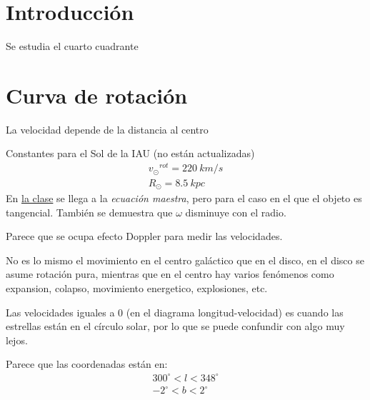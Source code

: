 \documentclass[letterpaper,oneside]{article}
\begin{document}
	
\templatePortrait

\templatePagecfg


\templateIndex

\templateFinalcfg


\section{Introducción}
Se estudia el cuarto cuadrante

\section{Curva de rotación}
La velocidad depende de la distancia al centro

Constantes para el Sol de la IAU (no están actualizadas)
\begin{gather*}
{v_{\odot}}^{rot}=220 \ km/s\\
R_{\odot} = 8.5 \ kpc
\end{gather*}
En \href{https://www.youtube.com/watch?v=Ijj2VhVSFsg}{la clase} se llega a la \textit{ecuación maestra}, pero para el caso en el que el objeto es tangencial. También se demuestra que $\omega$ disminuye con el radio.

Parece que se ocupa efecto Doppler para medir las velocidades.

No es lo mismo el movimiento en el centro galáctico que en el disco, en el disco se asume rotación pura, mientras que en el centro hay varios fenómenos como expansion, colapso, movimiento energetico, explosiones, etc.

Las velocidades iguales a 0 (en el diagrama longitud-velocidad) es cuando las estrellas están en el círculo solar, por lo que se puede confundir con algo muy lejos.

Parece que las coordenadas están en:
\begin{gather*}
300 ^{\circ}<l<348^{\circ}\\
-2^{\circ}<b<2^{\circ}
\end{gather*}
\end{document}
